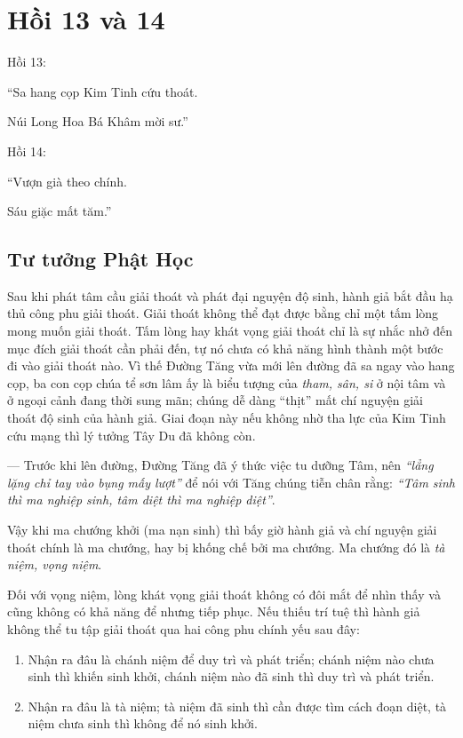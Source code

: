 \chapter{Hồi 13 và 14} %
\label{cha:hoi_13_14}

Hồi 13:

\begin{itshape}
``Sa hang cọp Kim Tinh cứu thoát.

Núi Long Hoa Bá Khâm mời sư.''
\end{itshape}

Hồi 14:

\begin{itshape}
``Vượn già theo chính.

Sáu giặc mất tăm.''
\end{itshape}

\section{Tư tưởng Phật Học} %
\label{sec:13_phat_hoc}

Sau khi phát tâm cầu giải thoát và phát đại nguyện độ sinh, hành giả bắt đầu hạ thủ công phu giải thoát. Giải thoát không thể đạt được bằng chỉ một tấm lòng mong muốn giải thoát. Tấm lòng hay khát vọng giải thoát chỉ là sự nhắc nhở đến mục đích giải thoát cần phải đến, tự nó chưa có khả năng hình thành một bước đi vào giải thoát nào. Vì thế Đường Tăng vừa mới lên đường đã sa ngay vào hang cọp, ba con cọp chúa tể sơn lâm ấy là biểu tượng của \emph{tham, sân, si} ở nội tâm và ở ngoại cảnh đang thời sung mãn; chúng dễ dàng ``thịt'' mất chí nguyện giải thoát độ sinh của hành giả. Giai đoạn này nếu không nhờ tha lực của Kim Tinh cứu mạng thì lý tưởng Tây Du đã không còn.

--- Trước khi lên đường, Đường Tăng đã ý thức việc tu dưỡng Tâm, nên \emph{``lẳng lặng chỉ tay vào bụng mấy lượt''} để nói với Tăng chúng tiễn chân rằng: \emph{``Tâm sinh thì ma nghiệp sinh, tâm diệt thì ma nghiệp diệt''}.

Vậy khi ma chướng khởi (ma nạn sinh) thì bấy giờ hành giả và chí nguyện giải thoát chính là ma chướng, hay bị khống chế bởi ma chướng. Ma chướng đó là \emph{tà niệm, vọng niệm}.

Đối với vọng niệm, lòng khát vọng giải thoát không có đôi mắt để nhìn thấy và cũng không có khả năng để nhưng tiếp phục. Nếu thiếu trí tuệ thì hành giả không thể tu tập giải thoát qua hai công phu chính yếu sau đây:

\begin{enumerate}[label=\itshape\arabic*\upshape/]
    \item Nhận ra đâu là chánh niệm để duy trì và phát triển; chánh niệm nào chưa sinh thì khiến sinh khởi, chánh niệm nào đã sinh thì duy trì và phát triển.

    \item Nhận ra đâu là tà niệm; tà niệm đã sinh thì cần được tìm cách đoạn diệt, tà niệm chưa sinh thì không để nó sinh khởi.
\end{enumerate}


